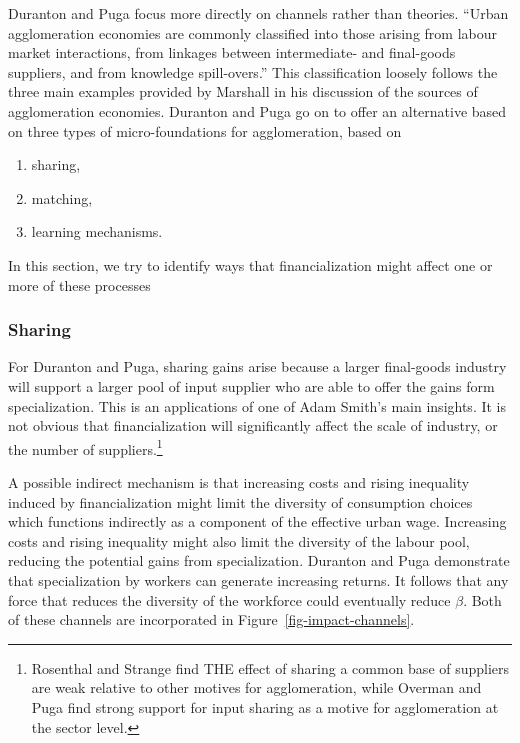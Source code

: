 Duranton and Puga \cite{durantonMicroFoundationsUrbanAgglomeration2004} focus more directly on channels rather than theories. ``Urban agglomeration economies are commonly classified into those arising from labour market interactions, from linkages between intermediate- and final-goods suppliers, and from knowledge spill-overs.'' This classification loosely follows the three main examples provided by Marshall \cite{marshallPrinciplesEconomics1890} in his discussion of the sources of agglomeration economies.  Duranton and Puga go on to offer an alternative based on three types of micro-foundations for agglomeration, based on \begin{enumerate}
\item sharing,
\item  matching, 
\item  learning mechanisms.
\end{enumerate}
In this section,  we try to identify ways that  financialization might affect one or more of these processes 

\subsubsection{Sharing}
For Duranton and Puga, sharing gains arise because a larger final-goods industry will support a larger pool of input supplier who are able to offer the gains form specialization. This is an applications of one of Adam Smith's main insights. It is not obvious that financialization will significantly affect the scale of industry, or the number of suppliers.\footnote{Rosenthal and Strange \cite{rosenthalEvidenceNatureSources2004} find THE effect of sharing a common base of suppliers  are weak relative to other motives for agglomeration, while 
 Overman and Puga \cite{overmanLaborPoolingSource2010} find strong support for input sharing as a motive for agglomeration at the sector level.}

A possible indirect mechanism is that increasing costs and rising inequality induced by financialization might limit the diversity of consumption choices which functions indirectly as a component of the effective urban wage. Increasing costs and rising inequality might also limit the diversity of the labour pool, reducing the potential gains from specialization. Duranton and Puga  demonstrate that specialization by workers can generate increasing returns. It follows that any force that reduces the diversity of the workforce could eventually reduce $\beta$.  Both of these channels are incorporated in Figure~\ref{fig-impact-channels}.


